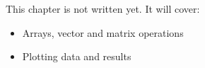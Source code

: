 \label{ch:py3}
\begin{keyidea}
This chapter is not written yet. It will cover:
\begin{itemize}[nosep]
  \item Arrays, vector and matrix operations
  \item Plotting data and results
\end{itemize}
\end{keyidea}
